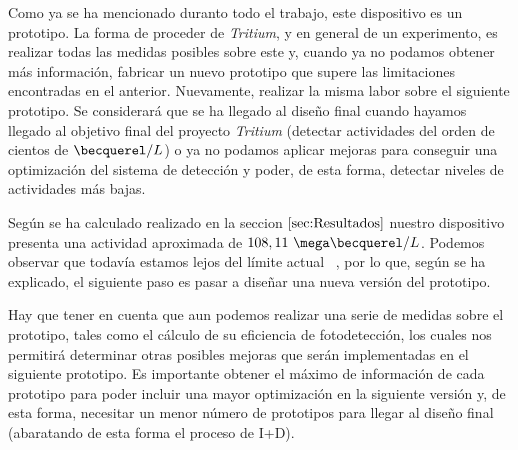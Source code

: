 Como ya se ha mencionado duranto todo el trabajo, este dispositivo es un prototipo. La forma de proceder de \textit{Tritium}, y en general de un experimento, es realizar todas las medidas posibles sobre este y, cuando ya no podamos obtener más información, fabricar un nuevo prototipo que supere las limitaciones encontradas en el anterior. Nuevamente, realizar la misma labor sobre el siguiente prototipo. Se considerará que se ha llegado al diseño final cuando hayamos llegado al objetivo final del proyecto \textit{Tritium} (detectar actividades del orden de cientos de $\becquerel/L$) o ya no podamos aplicar mejoras para conseguir una optimización del sistema de detección y poder, de esta forma, detectar niveles de actividades más bajas.

Según se ha calculado realizado en la seccion $\ref{sec:Resultados}$ nuestro dispositivo presenta una actividad aproximada de $108,11~\mega\becquerel/L$. Podemos observar que todavía estamos lejos del límite actual ~\cite{Rat}, por lo que, según se ha explicado, el siguiente paso es pasar a diseñar una nueva versión del prototipo. 

Hay que tener en cuenta que aun podemos realizar una serie de medidas sobre el prototipo, tales como el cálculo de su eficiencia de fotodetección, los cuales nos permitirá determinar otras posibles mejoras que serán implementadas en el siguiente prototipo. Es importante obtener el máximo de información de cada prototipo para poder incluir una mayor optimización en la siguiente versión y, de esta forma, necesitar un menor número de prototipos para llegar al diseño final (abaratando de esta forma el proceso de I+D). 

